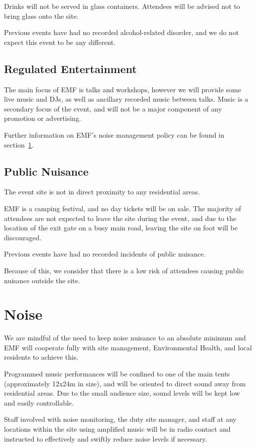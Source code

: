 Drinks will not be served in glass containers. Attendees will be advised not to bring
glass onto the site.

Previous events have had no recorded alcohol-related disorder, and we do not expect this event
to be any different.

\subsection{Regulated Entertainment}

The main focus of EMF is talks and workshops, however we will provide some live music and DJs,
as well as ancillary recorded music between talks. Music is a secondary focus of the
event, and will not be a major component of any promotion or advertising.

Further information on EMF's noise management policy can be found in section~\ref{noise}.

\subsection{Public Nuisance}

The event site is not in direct proximity to any residential areas.

EMF is a camping festival, and no day tickets will be on sale. The majority of attendees are not expected to leave the site
during the event, and due to the location of the exit gate on a busy main road, leaving the site on foot will be discouraged.

Previous events have had no recorded incidents of public nuisance.

Because of this, we consider that there is a low risk of attendees causing public nuisance outside the site.

\section{Noise}
\label{noise}
We are mindful of the need to keep noise nuisance to an absolute minimum and EMF will cooperate fully
with site management, Environmental Health, and local residents to achieve this.

Programmed music performances will be confined to one of the main tents (approximately 12x24m in size),
and will be oriented to direct sound away from residential areas. Due to the
small audience size, sound levels will be kept low and easily controllable.

Staff involved with noise monitoring, the duty site manager, and staff at any locations within the site
using amplified music will be in radio contact and instructed to effectively and swiftly reduce noise
levels if necessary.

